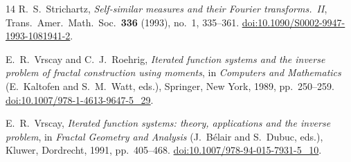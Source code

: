 \documentclass{amsart}
\theoremstyle{definition}
\theoremstyle{remark}
\begin{document}
\begin{thebibliography}{14}
R.~S.~Strichartz,
\textit{Self-similar measures and their Fourier transforms.~{II}},
Trans.\ Amer.\ Math.\ Soc.\ \textbf{336} (1993), no.~1, 335--361.
\href{https://doi.org/10.1090/S0002-9947-1993-1081941-2}{doi:10.1090/S0002-9947-1993-1081941-2}.

E.~R.~Vrscay and C.~J.~Roehrig,
\textit{Iterated function systems and the inverse problem of fractal
  construction using moments},
in \textit{Computers and Mathematics} (E.~Kaltofen and S.~M.~Watt, eds.),
Springer, New York, 1989, pp.~250--259.
\href{https://doi.org/10.1007/978-1-4613-9647-5_29}{doi:10.1007/978-1-4613-9647-5\_29}.

E.~R.~Vrscay,
\textit{Iterated function systems: theory, applications and the inverse
  problem},
in \textit{Fractal Geometry and Analysis} (J.~B\'elair and S.~Dubuc, eds.),
Kluwer, Dordrecht, 1991, pp.~405--468.
\href{https://doi.org/10.1007/978-94-015-7931-5_10}{doi:10.1007/978-94-015-7931-5\_10}.
\end{thebibliography}
\end{document}
